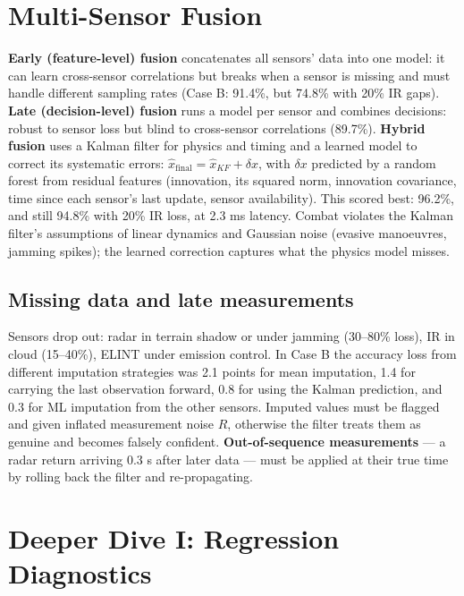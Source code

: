 \documentclass[11pt]{article}
\begin{document}
\section{Multi-Sensor Fusion}
\textbf{Early (feature-level) fusion} concatenates all sensors' data into one model: it can learn cross-sensor correlations but breaks when a sensor is missing and must handle different sampling rates (Case B: 91.4\%, but 74.8\% with 20\% IR gaps). \textbf{Late (decision-level) fusion} runs a model per sensor and combines decisions: robust to sensor loss but blind to cross-sensor correlations (89.7\%). \textbf{Hybrid fusion} uses a Kalman filter for physics and timing and a learned model to correct its systematic errors: $\hat x_{\text{final}}=\hat x_{KF}+\delta x$, with $\delta x$ predicted by a random forest from residual features (innovation, its squared norm, innovation covariance, time since each sensor's last update, sensor availability). This scored best: 96.2\%, and still 94.8\% with 20\% IR loss, at 2.3 ms latency. Combat violates the Kalman filter's assumptions of linear dynamics and Gaussian noise (evasive manoeuvres, jamming spikes); the learned correction captures what the physics model misses.

\subsection{Missing data and late measurements}
Sensors drop out: radar in terrain shadow or under jamming (30--80\% loss), IR in cloud (15--40\%), ELINT under emission control. In Case B the accuracy loss from different imputation strategies was 2.1 points for mean imputation, 1.4 for carrying the last observation forward, 0.8 for using the Kalman prediction, and 0.3 for ML imputation from the other sensors. Imputed values must be flagged and given inflated measurement noise $R$, otherwise the filter treats them as genuine and becomes falsely confident. \textbf{Out-of-sequence measurements} --- a radar return arriving 0.3 s after later data --- must be applied at their true time by rolling back the filter and re-propagating.

\section{Deeper Dive I: Regression Diagnostics}
\end{document}
